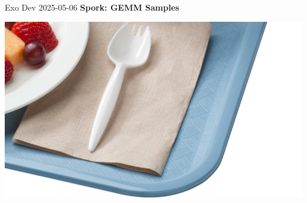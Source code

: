 { \LARGE Exo Dev 2025-05-06 } \hfill { \LARGE \textbf{\textsf{Spork: GEMM Samples}}}

\includegraphics[width=\linewidth]{usda_spork.jpg}

\newpage
{}

